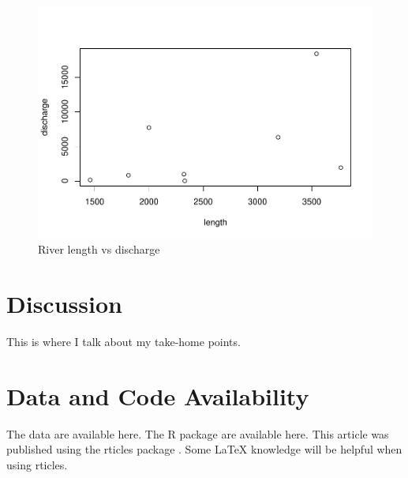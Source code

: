 \documentclass[]{interact}
\theoremstyle{plain}%
\theoremstyle{definition}
\theoremstyle{remark}
\begin{document}
\begin{figure}

{\centering \includegraphics[width=0.75\linewidth]{manuscript_files/figure-latex/rivers-1} 

}

\caption{River length vs discharge}\label{fig:rivers}
\end{figure}

\hypertarget{discussion}{%
\section{Discussion}\label{discussion}}

This is where I talk about my take-home points.

\hypertarget{data-and-code-availability}{%
\section*{Data and Code Availability}\label{data-and-code-availability}}

The data are available here. The R package are available here. This
article was published using the rticles package \citep{rticles2021}.
Some LaTeX knowledge will be helpful when using rticles.






\end{document}
